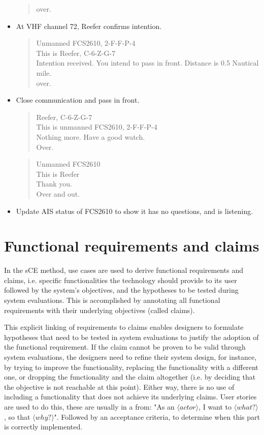 \begin{itemize}
\begin{quote}
			over.
		\end{quote}
	\item At \ac{VHF} channel 72, Reefer confirms intention.
		\begin{quote}
			Unmanned FCS2610, 2-F-F-P-4 \\
			This is Reefer, C-6-Z-G-7\\
			Intention received. You intend to pass in front. Distance is 0.5 Nautical mile.\\
			over.
		\end{quote}
	\item Close communication and pass in front.
		\begin{quote}
			Reefer, C-6-Z-G-7\\
			This is unmanned FCS2610, 2-F-F-P-4 \\
			Nothing more. Have a good watch. \\
			Over.
		\end{quote}
		\begin{quote}
			Unmanned FCS2610\\
			This is Reefer\\
			Thank you. \\
			Over and out.
		\end{quote}
	\item Update AIS status of FCS2610 to show it has no questions, and is listening.
\end{itemize}

\section{Functional requirements and claims}
In the sCE method, use cases are used to derive functional requirements and claims, i.e. specific functionalities the technology should provide to its user followed by the system’s objectives, and the hypotheses to be tested during system evaluations. This is accomplished by annotating all functional requirements with their underlying objectives (called claims).

This explicit linking of requirements to claims enables designers to formulate hypotheses that need to be tested in system evaluations to justify the adoption of the functional requirement. If the claim cannot be proven to be valid through system evaluations, the designers need to refine their system design, for instance, by trying to improve the functionality, replacing the functionality with a different one, or dropping the functionality and the claim altogether (i.e. by deciding that the objective is not reachable at this point). Either way, there is no use of including a functionality that does not achieve its underlying claims. User stories are used to do this, these are usually in a from: "As an $\langle actor \rangle$, I want to $\langle what? \rangle$, so that $\langle why? \rangle$". Followed by an acceptance criteria, to determine when this part is correctly implemented.

